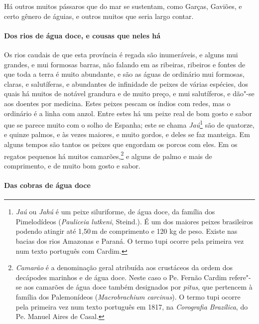  Há outros muitos pássaros que do mar se sustentam, como Garças,
Gaviões, e certo gênero de águias, e outros muitos que seria largo contar.

\paragraph{Dos rios de água doce, e cousas que neles há}

 Os rios caudais de que esta província é regada são inumeráveis, e
alguns mui grandes, e mui formosas barras, não falando em as ribeiras,
ribeiros e fontes de que toda a terra é muito abundante, e são as águas
de ordinário mui formosas, claras, e salutíferas, e abundantes de
infinidade de peixes de várias espécies, dos quais há muitos de notável
grandura e de muito preço, e mui salutíferos, e dão"-se aos doentes por
medicina. Estes peixes pescam os índios com redes, mas o ordinário é a
linha com anzol. Entre estes há um peixe real de bom gosto e sabor que
se parece muito com o solho de Espanha; este se chama 
\textit{Jaú}\footnote{ \textit{Jaú} ou \textit{Jahú} é um peixe siluriforme,
de água doce, da família dos Pimelodídeos (\textit{Pauliceia lutkeni}, Steind.). 
É um dos maiores peixes brasileiros podendo atingir até
1,50\,m de comprimento e 120 kg de peso. Existe nas bacias dos rios
Amazonas e Paraná. O termo tupi ocorre pela primeira vez num texto
português com Cardim.} são de quatorze, e quinze palmos, e às vezes
maiores, e muito gordos, e deles se faz manteiga. Em alguns tempos são
tantos os peixes que engordam os porcos com eles. Em os regatos
pequenos há muitos camarões,\footnote{ \textit{Camarão} é a
denominação geral atribuída aos crustáceos da ordem dos decápodes
marinhos e de água doce. Neste caso o Pe. Fernão Cardim refere"-se aos
camarões de água doce também designados por \textit{pitus}, que
pertencem à família dos Palemonídeos (\textit{Macrobrachium carcinus}). 
O termo tupi ocorre pela primeira vez num texto português em 1817, na
\textit{Corografia Brazílica}, do Pe. Manuel Aires de Casal.} e alguns
de palmo e mais de comprimento, e de muito bom gosto e sabor.

\paragraph{Das cobras de água doce}


